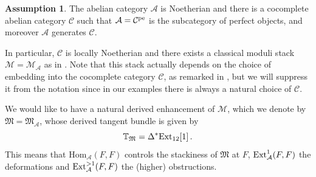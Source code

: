 \documentclass[12pt]{amsart}
\theoremstyle{definition}
\newtheorem{assumption}[definition]{Assumption}
\newcommand{\BT}{{\mathbb{T}}}
\newcommand{\CA}{{\mathcal A}}
\newcommand{\CC}{{\mathcal C}}
\newcommand{\CM}{{\mathcal M}}
\newcommand{\1}{\mathbf 1}
\newcommand{\FM}{{\mathfrak{M}}}
\newcommand{\Ext}{\mathcal{E}\text{xt}}
\newcommand{\Hom}{\mathrm{Hom}}
\renewcommand{\Ext}{\textup{Ext}}
\begin{document}
\begin{assumption}\label{ass: good1}
    The abelian category $\CA$ is Noetherian and there is a cocomplete abelian category $\CC$ such that $\CA=\CC^{\textup{pe}}$ is the subcategory of perfect objects, and moreover $\CA$ generates $\CC$.
\end{assumption}


In particular, $\CC$ is locally Noetherian and there exists a classical moduli stack $\CM=\CM_\CA$ as in \cite[Section 7.1]{AHLH}. Note that this stack actually depends on the choice of embedding into the cocomplete category $\CC$, as remarked in \cite[Warning 7.11]{AHLH}, but we will suppress it from the notation since in our examples there is always a natural choice of $\CC$.

We would like to have a natural derived enhancement of $\CM$, which we denote by $\FM=\FM_\CA$, whose derived tangent bundle is given by
\begin{equation}\label{eq: derivedtangentFM}
    \BT_{\FM}=\Delta^\ast \Ext_{12}[1]\,.\end{equation}
This means that $\Hom_\CA(F, F)$ controls the stackiness of $\FM$ at $F$, $\Ext^1_\CA(F, F)$ the deformations and $\Ext^{>1}_\CA(F, F)$ the (higher) obstructions. 
\end{document}
